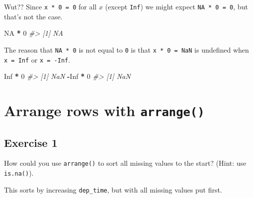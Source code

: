 \documentclass[]{book}
\newenvironment{Shaded}{\begin{snugshade}}{\end{snugshade}}
\newcommand{\CommentTok}[1]{\textcolor[rgb]{0.56,0.35,0.01}{\textit{#1}}}
\newcommand{\DecValTok}[1]{\textcolor[rgb]{0.00,0.00,0.81}{#1}}
\newcommand{\OperatorTok}[1]{\textcolor[rgb]{0.81,0.36,0.00}{\textbf{#1}}}
\newcommand{\OtherTok}[1]{\textcolor[rgb]{0.56,0.35,0.01}{#1}}
\newcommand{\StringTok}[1]{\textcolor[rgb]{0.31,0.60,0.02}{#1}}
\theoremstyle{plain}
\theoremstyle{remark}
\theoremstyle{definition}
\theoremstyle{definition}
\theoremstyle{definition}
\theoremstyle{remark}
\begin{document}
Wut?? Since \texttt{x\ *\ 0\ =\ 0} for all \(x\) (except \texttt{Inf})
we might expect \texttt{NA\ *\ 0\ =\ 0}, but that's not the case.

\begin{Shaded}
\begin{Highlighting}[]
\OtherTok{NA} \OperatorTok{*}\StringTok{ }\DecValTok{0}
\CommentTok{#> [1] NA}
\end{Highlighting}
\end{Shaded}

The reason that \texttt{NA\ *\ 0} is not equal to \texttt{0} is that
\texttt{x\ *\ 0\ =\ NaN} is undefined when \texttt{x\ =\ Inf} or
\texttt{x\ =\ -Inf}.

\begin{Shaded}
\begin{Highlighting}[]
\OtherTok{Inf} \OperatorTok{*}\StringTok{ }\DecValTok{0}
\CommentTok{#> [1] NaN}
\OperatorTok{-}\OtherTok{Inf} \OperatorTok{*}\StringTok{ }\DecValTok{0}
\CommentTok{#> [1] NaN}
\end{Highlighting}
\end{Shaded}

\hypertarget{arrange-rows-with-arrange}{%
\section{\texorpdfstring{Arrange rows with
\texttt{arrange()}}{Arrange rows with arrange()}}\label{arrange-rows-with-arrange}}

\hypertarget{exercise-1-7}{%
\subsection{Exercise 1}\label{exercise-1-7}}

How could you use \texttt{arrange()} to sort all missing values to the
start? (Hint: use \texttt{is.na()}).

This sorts by increasing \texttt{dep\_time}, but with all missing values
put first.
\end{document}
